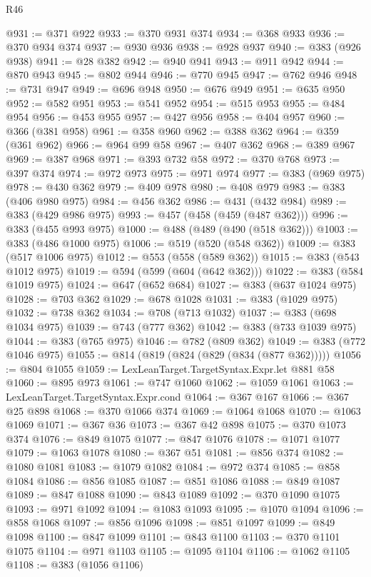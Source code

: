 \begin{lexlean}{R46}
\begin{coremodule}
@931 := @371 @922
@933 := @370 @931 @374
@934 := @368 @933
@936 := @370 @934 @374
@937 := @930 @936
@938 := @928 @937
@940 := @383 (@926 @938)
@941 := @28 @382
@942 := @940 @941
@943 := @911 @942
@944 := @870 @943
@945 := @802 @944
@946 := @770 @945
@947 := @762 @946
@948 := @731 @947
@949 := @696 @948
@950 := @676 @949
@951 := @635 @950
@952 := @582 @951
@953 := @541 @952
@954 := @515 @953
@955 := @484 @954
@956 := @453 @955
@957 := @427 @956
@958 := @404 @957
@960 := @366 (@381 @958)
@961 := @358 @960
@962 := @388 @362
@964 := @359 (@361 @962)
@966 := @964 @99 @58
@967 := @407 @362
@968 := @389 @967
@969 := @387 @968
@971 := @393 @732 @58
@972 := @370 @768
@973 := @397 @374
@974 := @972 @973
@975 := @971 @974
@977 := @383 (@969 @975)
@978 := @430 @362
@979 := @409 @978
@980 := @408 @979
@983 := @383 (@406 @980 @975)
@984 := @456 @362
@986 := @431 (@432 @984)
@989 := @383 (@429 @986 @975)
@993 := @457 (@458 (@459 (@487 @362)))
@996 := @383 (@455 @993 @975)
@1000 := @488 (@489 (@490 (@518 @362)))
@1003 := @383 (@486 @1000 @975)
@1006 := @519 (@520 (@548 @362))
@1009 := @383 (@517 @1006 @975)
@1012 := @553 (@558 (@589 @362))
@1015 := @383 (@543 @1012 @975)
@1019 := @594 (@599 (@604 (@642 @362)))
@1022 := @383 (@584 @1019 @975)
@1024 := @647 (@652 @684)
@1027 := @383 (@637 @1024 @975)
@1028 := @703 @362
@1029 := @678 @1028
@1031 := @383 (@1029 @975)
@1032 := @738 @362
@1034 := @708 (@713 @1032)
@1037 := @383 (@698 @1034 @975)
@1039 := @743 (@777 @362)
@1042 := @383 (@733 @1039 @975)
@1044 := @383 (@765 @975)
@1046 := @782 (@809 @362)
@1049 := @383 (@772 @1046 @975)
@1055 := @814 (@819 (@824 (@829 (@834 (@877 @362)))))
@1056 := @804 @1055
@1059 := LexLeanTarget.TargetSyntax.Expr.let @881 @58
@1060 := @895 @973
@1061 := @747 @1060
@1062 := @1059 @1061
@1063 := LexLeanTarget.TargetSyntax.Expr.cond
@1064 := @367 @167
@1066 := @367 @25 @898
@1068 := @370 @1066 @374
@1069 := @1064 @1068
@1070 := @1063 @1069
@1071 := @367 @36
@1073 := @367 @42 @898
@1075 := @370 @1073 @374
@1076 := @849 @1075
@1077 := @847 @1076
@1078 := @1071 @1077
@1079 := @1063 @1078
@1080 := @367 @51
@1081 := @856 @374
@1082 := @1080 @1081
@1083 := @1079 @1082
@1084 := @972 @374
@1085 := @858 @1084
@1086 := @856 @1085
@1087 := @851 @1086
@1088 := @849 @1087
@1089 := @847 @1088
@1090 := @843 @1089
@1092 := @370 @1090 @1075
@1093 := @971 @1092
@1094 := @1083 @1093
@1095 := @1070 @1094
@1096 := @858 @1068
@1097 := @856 @1096
@1098 := @851 @1097
@1099 := @849 @1098
@1100 := @847 @1099
@1101 := @843 @1100
@1103 := @370 @1101 @1075
@1104 := @971 @1103
@1105 := @1095 @1104
@1106 := @1062 @1105
@1108 := @383 (@1056 @1106)

\end{coremodule}
\end{lexlean}
